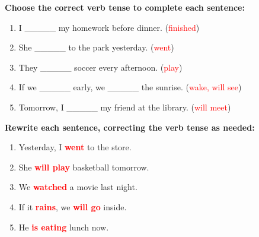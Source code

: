 \documentclass[12pt]{article}
\begin{document}
\vspace{1em}

\begin{tcolorbox}[colframe=black!60, colback=white, 
coltitle=black, colbacktitle=black!15, fonttitle=\bfseries\Large, 
title=Guided Practice, halign title=center, left=10pt, right=10pt, top=10pt, bottom=15pt]
\textbf{Choose the correct verb tense to complete each sentence:}
\begin{enumerate}[itemsep=3em]
    \item I \_\_\_\_\_ my homework before dinner. (\textcolor{red}{finished})
    \item She \_\_\_\_\_ to the park yesterday. (\textcolor{red}{went})
    \item They \_\_\_\_\_ soccer every afternoon. (\textcolor{red}{play})
    \item If we \_\_\_\_\_ early, we \_\_\_\_\_ the sunrise. (\textcolor{red}{wake, will see})
    \item Tomorrow, I \_\_\_\_\_ my friend at the library. (\textcolor{red}{will meet})
\end{enumerate}
\end{tcolorbox}

\vspace{1em}

\begin{tcolorbox}[colframe=black!60, colback=white, 
coltitle=black, colbacktitle=black!15, fonttitle=\bfseries\Large, 
title=Independent Practice, halign title=center, left=10pt, right=10pt, top=10pt, bottom=15pt]
\textbf{Rewrite each sentence, correcting the verb tense as needed:}
\begin{enumerate}[itemsep=3em]
    \item Yesterday, I \textbf{\textcolor{red}{went}} to the store.
    \item She \textbf{\textcolor{red}{will play}} basketball tomorrow.
    \item We \textbf{\textcolor{red}{watched}} a movie last night.
    \item If it \textbf{\textcolor{red}{rains}}, we \textbf{\textcolor{red}{will go}} inside.
    \item He \textbf{\textcolor{red}{is eating}} lunch now.
\end{enumerate}
\end{tcolorbox}

\vspace{1em}
\end{document}
